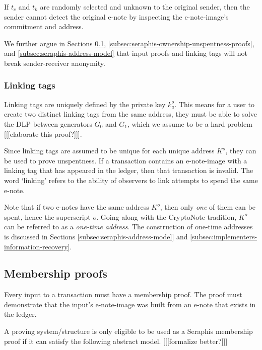 If $t_c$ and $t_k$ are randomly selected and unknown to the original sender, then the sender cannot detect the original e-note by inspecting the e-note-image's commitment and address.

We further argue in Sections \ref{subsec:seraphis-membership proofs}, \ref{subsec:seraphis-ownership-unspentness-proofs}, and \ref{subsec:seraphis-address-model} that input proofs and linking tags will not break sender-receiver anonymity.

\subsubsection{Linking tags}
\label{subsubsec:e-note-images-linking-tags}

Linking tags are uniquely defined by the private key $k^o_a$. This means for a user to create two distinct linking tags from the same address, they must be able to solve the DLP between generators $G_0$ and $G_1$, which we assume to be a hard problem [[[elaborate this proof?]]].

Since linking tags are assumed to be unique for each unique address $K^o$, they can be used to prove unspentness. If a transaction contains an e-note-image with a linking tag that has appeared in the ledger, then that transaction is invalid. The word `linking' refers to the ability of observers to link attempts to spend the same e-note.

Note that if two e-notes have the same address $K^o$, then only {\em one} of them can be spent, hence the superscript $o$. Going along with the CryptoNote tradition, $K^o$ can be referred to as a {\em one-time address}. The construction of one-time addresses is discussed in Sections \ref{subsec:seraphis-address-model} and \ref{subsec:implementers-information-recovery}.


\subsection{Membership proofs}
\label{subsec:seraphis-membership proofs}

Every input to a transaction must have a membership proof. The proof must demonstrate that the input's e-note-image was built from an e-note that exists in the ledger.

A proving system/structure is only eligible to be used as a Seraphis membership proof if it can satisfy the following abstract model. [[[formalize better?]]]

